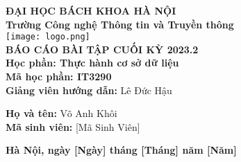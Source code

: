 \documentclass[a4paper,12pt]{article}
\begin{document}
\begin{titlepage}
    \begin{center}
        \textbf{\large ĐẠI HỌC BÁCH KHOA HÀ NỘI}\\
        \textbf{\large Trường Công nghệ Thông tin và Truyền thông}\\[1cm]
        \texttt{[image: logo.png]} \\[3cm] %
       
        
        \textbf{\Huge BÁO CÁO BÀI TẬP CUỐI KỲ 2023.2}\\[0.5cm]
        \textbf{\Huge Học phần: Thực hành cơ sở dữ liệu}\\[0.5cm]
        \textbf{\Huge Mã học phần: IT3290}\\[0.5cm]
        \textbf{Giảng viên hướng dẫn:} Lê Đức Hậu\\
        \begin{flushleft}
            \textbf{Họ và tên:} Võ Anh Khôi\\[0.5cm]
            \textbf{Mã sinh viên:} [Mã Sinh Viên]\\[0.5cm]
        
        \end{flushleft}
        
        \vfill
        
        \textbf{\large Hà Nội, ngày [Ngày] tháng [Tháng] năm [Năm]}
        
    \end{center}
\end{titlepage}
\end{document}

